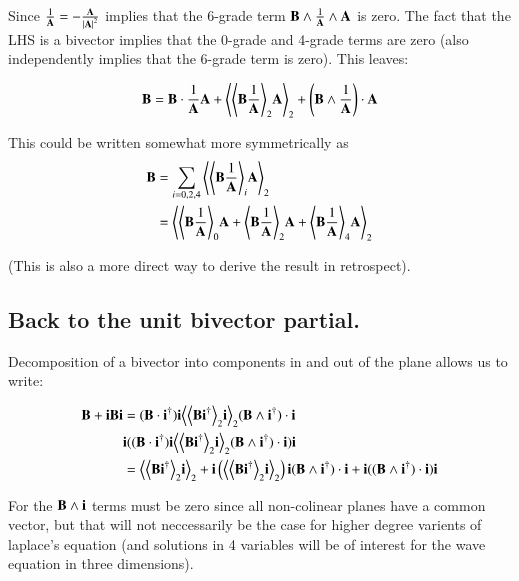 \documentclass{article}      %
\newcommand{\gpgrade}[2] {{\left\langle{{#1}}\right\rangle}_{#2}}
\newcommand{\gpgradezero}[1] {\gpgrade{#1}{0}}
\newcommand{\gpgradetwo}[1] {\gpgrade{#1}{2}}
\newcommand{\gpgradefour}[1] {\gpgrade{#1}{4}}
\begin{document}
Since $\frac{1}{\mathbf{A}} = -\frac{\mathbf{A}}{{\lvert{\mathbf{A}}\rvert}^2}$ implies that the 6-grade term $\mathbf{B} \wedge \frac{1}{\mathbf{A}} \wedge \mathbf{A}$ is zero.  The fact that the LHS is a bivector
implies that the 0-grade and 4-grade terms are zero (also independently implies that the 6-grade term is zero).  This leaves:

\begin{equation}\label{eqn:bivectorprojbivector}
\BB
= 
\BB \cdot \inv{\BA} \BA \\
+\gpgradetwo{\gpgradetwo{\BB\inv\BA} \BA}
+\left(\BB \wedge \inv{\BA}\right) \cdot \BA 
\end{equation}

This could be written somewhat more symmetrically as
\begin{align*}
\BB
&=\sum_{i=0,2,4}\gpgradetwo{\gpgrade{\BB \inv{\BA}}{i} \BA} \\
&= \gpgradetwo{ \gpgradezero{\BB \inv{\BA}} \BA +\gpgradetwo{\BB \inv{\BA}} \BA +\gpgradefour{\BB \inv{\BA}} \BA } \\
\end{align*}

(This is also a more direct way to derive the result in retrospect).

\subsection{ Back to the unit bivector partial. }

Decomposition of a bivector into components in and out of the plane allows us to write:

\begin{align*}
\BB + \Bi\BB\Bi
&=
(\BB \cdot {\Bi}^\dagger) \Bi 
\gpgradetwo{\gpgradetwo{\BB \Bi^\dagger} \Bi}
(\BB \wedge {\Bi}^\dagger) \cdot \Bi  \\
&\Bi(
(\BB \cdot {\Bi}^\dagger) \Bi 
\gpgradetwo{\gpgradetwo{\BB \Bi^\dagger} \Bi}
(\BB \wedge {\Bi}^\dagger) \cdot \Bi )\Bi \\
&=
\gpgradetwo{\gpgradetwo{\BB \Bi^\dagger} \Bi} + \Bi\left( \gpgradetwo{\gpgradetwo{\BB \Bi^\dagger} \Bi} \right)\Bi 
(\BB \wedge {\Bi}^\dagger) \cdot \Bi + \Bi( (\BB \wedge {\Bi}^\dagger) \cdot \Bi ) \Bi \\
\end{align*}

For  the $\mathbf{B} \wedge \mathbf{i}$ terms must be zero since all non-colinear planes have a common vector, but that will not neccessarily be the case for
higher degree varients of laplace's equation (and solutions in 4 variables will be of interest for the wave equation in three dimensions).
\end{document}
